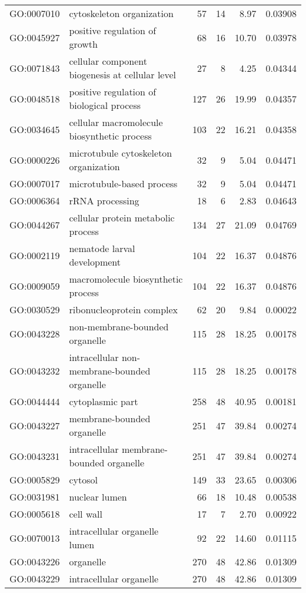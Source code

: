 \begin{longtable}{lp{4.5cm}rrrl}
  GO:0007010 & cytoskeleton organization &  57 &  14 & 8.97 & 0.03908 \\ 
  GO:0045927 & positive regulation of growth &  68 &  16 & 10.70 & 0.03978 \\ 
  GO:0071843 & cellular component biogenesis at cellular level &  27 &   8 & 4.25 & 0.04344 \\ 
  GO:0048518 & positive regulation of biological process & 127 &  26 & 19.99 & 0.04357 \\ 
  GO:0034645 & cellular macromolecule biosynthetic process & 103 &  22 & 16.21 & 0.04358 \\ 
  GO:0000226 & microtubule cytoskeleton organization &  32 &   9 & 5.04 & 0.04471 \\ 
  GO:0007017 & microtubule-based process &  32 &   9 & 5.04 & 0.04471 \\ 
  GO:0006364 & rRNA processing &  18 &   6 & 2.83 & 0.04643 \\ 
  GO:0044267 & cellular protein metabolic process & 134 &  27 & 21.09 & 0.04769 \\ 
  GO:0002119 & nematode larval development & 104 &  22 & 16.37 & 0.04876 \\ 
  GO:0009059 & macromolecule biosynthetic process & 104 &  22 & 16.37 & 0.04876 \\ 
  GO:0030529 & ribonucleoprotein complex &  62 &  20 & 9.84 & 0.00022 \\ 
  GO:0043228 & non-membrane-bounded organelle & 115 &  28 & 18.25 & 0.00178 \\ 
  GO:0043232 & intracellular non-membrane-bounded organelle & 115 &  28 & 18.25 & 0.00178 \\ 
  GO:0044444 & cytoplasmic part & 258 &  48 & 40.95 & 0.00181 \\ 
  GO:0043227 & membrane-bounded organelle & 251 &  47 & 39.84 & 0.00274 \\ 
  GO:0043231 & intracellular membrane-bounded organelle & 251 &  47 & 39.84 & 0.00274 \\ 
  GO:0005829 & cytosol & 149 &  33 & 23.65 & 0.00306 \\ 
  GO:0031981 & nuclear lumen &  66 &  18 & 10.48 & 0.00538 \\ 
  GO:0005618 & cell wall &  17 &   7 & 2.70 & 0.00922 \\ 
  GO:0070013 & intracellular organelle lumen &  92 &  22 & 14.60 & 0.01115 \\ 
  GO:0043226 & organelle & 270 &  48 & 42.86 & 0.01309 \\ 
  GO:0043229 & intracellular organelle & 270 &  48 & 42.86 & 0.01309 \\ 

\end{longtable}
